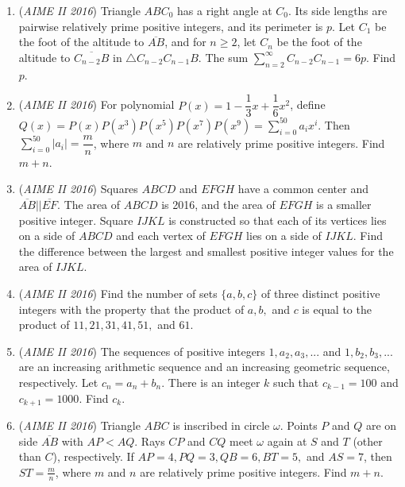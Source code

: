\begin{enumerate}
 

	\item (\textit{AIME II 2016}) Triangle $ABC_0$ has a right angle at $C_0$. Its side lengths are pairwise relatively prime positive integers, and its perimeter is $p$. Let $C_1$ be the foot of the altitude to $\overline{AB}$, and for $n \geq 2$, let $C_n$ be the foot of the altitude to $\overline{C_{n-2}B}$ in $\triangle C_{n-2}C_{n-1}B$. The sum $\sum_{n=2}^\infty C_{n-2}C_{n-1} = 6p$. Find $p$.


 

	\item (\textit{AIME II 2016}) For polynomial $P(x)=1-\dfrac{1}{3}x+\dfrac{1}{6}x^{2}$, define
$Q(x)=P(x)P(x^{3})P(x^{5})P(x^{7})P(x^{9})=\sum_{i=0}^{50} a_ix^{i}$.
Then $\sum_{i=0}^{50} |a_i|=\dfrac{m}{n}$, where $m$ and $n$ are relatively prime positive integers. Find $m+n$.


 

	\item (\textit{AIME II 2016}) Squares $ABCD$ and $EFGH$ have a common center and $\overline{AB} || \overline{EF}$. The area of $ABCD$ is 2016, and the area of $EFGH$ is a smaller positive integer. Square $IJKL$ is constructed so that each of its vertices lies on a side of $ABCD$ and each vertex of $EFGH$ lies on a side of $IJKL$. Find the difference between the largest and smallest positive integer values for the area of $IJKL$.


 

	\item (\textit{AIME II 2016}) Find the number of sets $\{a,b,c\}$ of three distinct positive integers with the property that the product of $a,b,$ and $c$ is equal to the product of $11,21,31,41,51,$ and $61$.


 

	\item (\textit{AIME II 2016}) The sequences of positive integers $1,a_2, a_3,...$ and $1,b_2, b_3,...$ are an increasing arithmetic sequence and an increasing geometric sequence, respectively. Let $c_n=a_n+b_n$. There is an integer $k$ such that $c_{k-1}=100$ and $c_{k+1}=1000$. Find $c_k$.


 

	\item (\textit{AIME II 2016}) Triangle $ABC$ is inscribed in circle $\omega$. Points $P$ and $Q$ are on side $\overline{AB}$ with $AP<AQ$. Rays $CP$ and $CQ$ meet $\omega$ again at $S$ and $T$ (other than $C$), respectively. If $AP=4,PQ=3,QB=6,BT=5,$ and $AS=7$, then $ST=\frac{m}{n}$, where $m$ and $n$ are relatively prime positive integers. Find $m+n$.



\end{enumerate}
